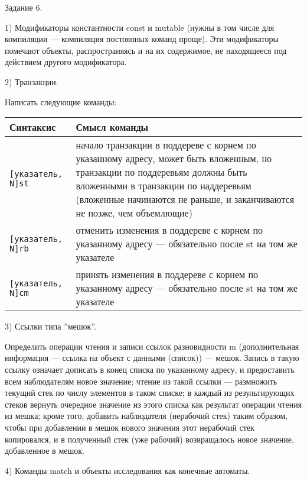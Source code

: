 \documentclass{report}
\begin{document}
    Задание 6. 

    1) Модификаторы константности const и mutable (нужны в том числе для компиляции --- компиляция постоянных команд проще). Эти модификаторы помечают объекты, распространяясь и на их содержимое, не находящееся под действием другого модификатора.

    2) Транзакции.

    Написать следующие команды:
    \begin{center}
    \begin{tabular}{|l|p{10cm}|}
        \hline
        Синтаксис&Смысл команды\\
        \hline
        \verb|[указатель, N]st|&начало транзакции в поддереве с корнем по указанному адресу, может быть вложенным, но транзакции по поддеревьям должны быть вложенными в транзакции по наддеревьям (вложенные начинаются не раньше, и заканчиваются не позже, чем объемлющие)\\
        \verb|[указатель, N]rb|&отменить изменения в поддереве с корнем по указанному адресу --- обязательно после st на том же указателе\\
        \verb|[указатель, N]cm|&принять изменения в поддереве с корнем по указанному адресу --- обязательно после st на том же указателе\\
        \hline
    \end{tabular}
    \end{center}

    3) Ссылки типа ''мешок''.

    Определить операции чтения и записи ссылок разновидности m (дополнительная информация --- ссылка на объект с данными (список)) --- мешок. Запись в такую ссылку означает дописать в конец списка по указанному адресу, и предоставить всем наблюдателям новое значение; чтение из такой ссылки --- размножить текущий стек по числу элементов в таком списке; в каждый из результирующих стеков вернуть очередное значение из этого списка как результат операции чтения из мешка; кроме того, добавить наблюдателя (нерабочий стек) таким образом, чтобы при добавлении в мешок нового значения этот нерабочий стек копировался, и в полученный стек (уже рабочий) возвращалось новое значение, добавленное в мешок.

    4) Команды match и объекты исследования как конечные автоматы.
\end{document}
